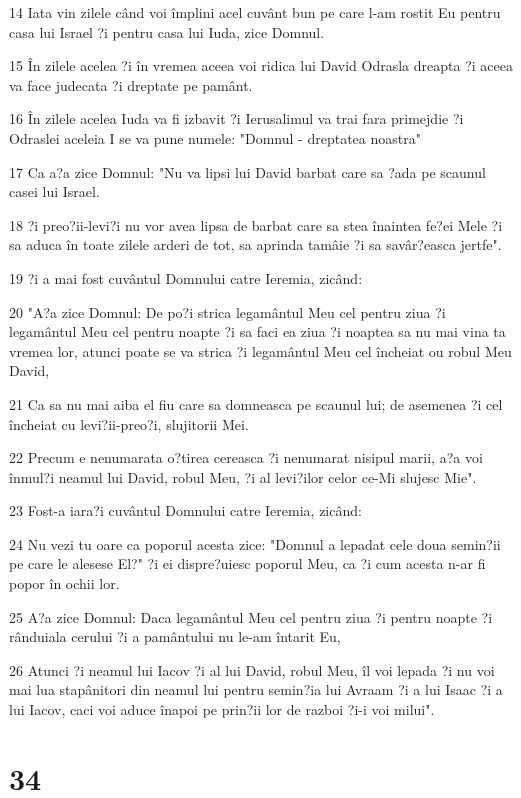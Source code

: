 \par 14 Iata vin zilele când voi împlini acel cuvânt bun pe care l-am rostit Eu pentru casa lui Israel ?i pentru casa lui Iuda, zice Domnul.
\par 15 În zilele acelea ?i în vremea aceea voi ridica lui David Odrasla dreapta ?i aceea va face judecata ?i dreptate pe pamânt.
\par 16 În zilele acelea Iuda va fi izbavit ?i Ierusalimul va trai fara primejdie ?i Odraslei aceleia I se va pune numele: "Domnul - dreptatea noastra"
\par 17 Ca a?a zice Domnul: "Nu va lipsi lui David barbat care sa ?ada pe scaunul casei lui Israel.
\par 18 ?i preo?ii-levi?i nu vor avea lipsa de barbat care sa stea înaintea fe?ei Mele ?i sa aduca în toate zilele arderi de tot, sa aprinda tamâie ?i sa savâr?easca jertfe".
\par 19 ?i a mai fost cuvântul Domnului catre Ieremia, zicând:
\par 20 "A?a zice Domnul: De po?i strica legamântul Meu cel pentru ziua ?i legamântul Meu cel pentru noapte ?i sa faci ea ziua ?i noaptea sa nu mai vina ta vremea lor, atunci poate se va strica ?i legamântul Meu cel încheiat ou robul Meu David,
\par 21 Ca sa nu mai aiba el fiu care sa domneasca pe scaunul lui; de asemenea ?i cel încheiat cu levi?ii-preo?i, slujitorii Mei.
\par 22 Precum e nenumarata o?tirea cereasca ?i nenumarat nisipul marii, a?a voi înmul?i neamul lui David, robul Meu, ?i al levi?ilor celor ce-Mi slujesc Mie".
\par 23 Fost-a iara?i cuvântul Domnului catre Ieremia, zicând:
\par 24 Nu vezi tu oare ca poporul acesta zice: "Domnul a lepadat cele doua semin?ii pe care le alesese El?" ?i ei dispre?uiesc poporul Meu, ca ?i cum acesta n-ar fi popor în ochii lor.
\par 25 A?a zice Domnul: Daca legamântul Meu cel pentru ziua ?i pentru noapte ?i rânduiala cerului ?i a pamântului nu le-am întarit Eu,
\par 26 Atunci ?i neamul lui Iacov ?i al lui David, robul Meu, îl voi lepada ?i nu voi mai lua stapânitori din neamul lui pentru semin?ia lui Avraam ?i a lui Isaac ?i a lui Iacov, caci voi aduce înapoi pe prin?ii lor de razboi ?i-i voi milui".

\chapter{34}

